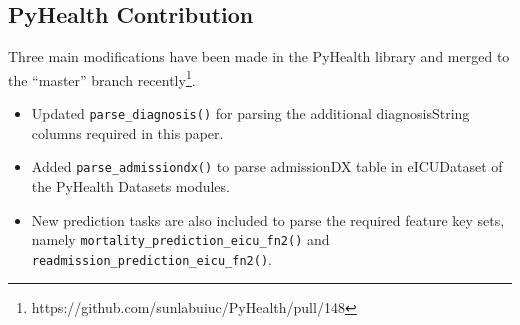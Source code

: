 \documentclass[11pt,a4paper]{article}
\begin{document}
\subsection{PyHealth Contribution}
\label{subsec:PyHealthContrib}
Three main modifications have been made in the PyHealth library and merged to the “master” branch recently\footnote{https://github.com/sunlabuiuc/PyHealth/pull/148}.
\begin{itemize}
\item Updated \texttt{parse\_diagnosis()} for parsing the additional diagnosisString columns required in this paper.

\item Added \texttt{parse\_admissiondx()} to parse admissionDX table in eICUDataset of the PyHealth Datasets modules.

\item New prediction tasks are also included to parse the required feature key sets, namely \texttt{mortality\_prediction\_eicu\_fn2()} and \texttt{readmission\_prediction\_eicu\_fn2()}.
\end{itemize}

\newpage


\end{document}

